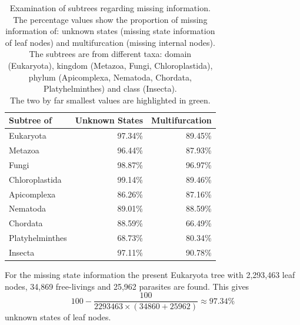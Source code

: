     \begin{table}[h!]
      \begin{center}
        \begin{tabular}{ |l||r|r| }
          \hline
          \bfseries Subtree of & \bfseries Unknown States & \bfseries Multifurcation \\ 
          \hline \hline
          Eukaryota       & 97.34\%  & 89.45\% \\
          \hline \hline
          Metazoa         & 96.44\%  & 87.93\% \\ \hline
          Fungi           & 98.87\%  & 96.97\% \\ \hline
          Chloroplastida  & 99.14\%  & 89.46\% \\
          \hline \hline            
          Apicomplexa     & 86.26\%  & 87.16\% \\ \hline
          Nematoda        & 89.01\%  & 88.59\% \\ \hline
          Chordata        & 88.59\%  & \cellcolor{green!50}66.49\% \\ \hline
          Platyhelminthes & \cellcolor{green!50}68.73\%  & 80.34\% \\
          \hline \hline            
          Insecta         & 97.11\%  & 90.78\% \\
          \hline  
        \end{tabular}
      \end{center}
      \caption{Examination of subtrees regarding missing information. \\
        The percentage values show the proportion of missing information of: unknown states (missing state 
          information of leaf nodes) and multifurcation (missing internal nodes). \\
        The subtrees are from different taxa: domain (Eukaryota), kingdom (Metazoa, Fungi, 
          Chloroplastida), phylum (Apicomplexa, Nematoda, Chordata, Platyhelminthes) and class 
          (Insecta). \\
        The two by far smallest values are highlighted in green.} 
      \label{table:percentage loss information subtrees} 
    \end{table}

    For the missing state information the present Eukaryota tree with 2,293,463 leaf nodes, 34,869 
      free-livings and 25,962 parasites are found. This gives
      $$100-\frac{100}{2293463 \times (34860+25962)} \approx 97.34\%$$
      unknown states of leaf nodes.

